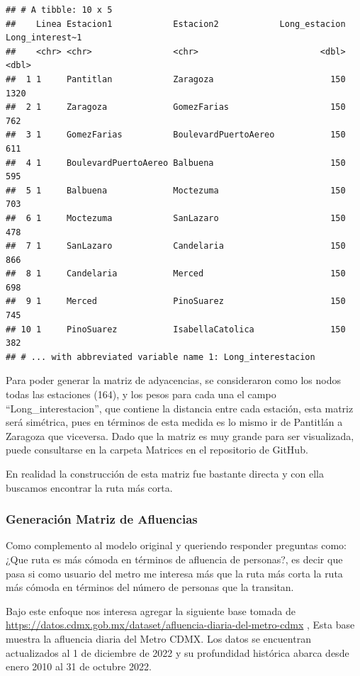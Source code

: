 \documentclass[
]{article}
\begin{document}
\begin{verbatim}
## # A tibble: 10 x 5
##    Linea Estacion1            Estacion2            Long_estacion Long_interest~1
##    <chr> <chr>                <chr>                        <dbl>           <dbl>
##  1 1     Pantitlan            Zaragoza                       150            1320
##  2 1     Zaragoza             GomezFarias                    150             762
##  3 1     GomezFarias          BoulevardPuertoAereo           150             611
##  4 1     BoulevardPuertoAereo Balbuena                       150             595
##  5 1     Balbuena             Moctezuma                      150             703
##  6 1     Moctezuma            SanLazaro                      150             478
##  7 1     SanLazaro            Candelaria                     150             866
##  8 1     Candelaria           Merced                         150             698
##  9 1     Merced               PinoSuarez                     150             745
## 10 1     PinoSuarez           IsabellaCatolica               150             382
## # ... with abbreviated variable name 1: Long_interestacion
\end{verbatim}

Para poder generar la matriz de adyacencias, se consideraron como los
nodos todas las estaciones (164), y los pesos para cada una el campo
``Long\_interestacion'', que contiene la distancia entre cada estación,
esta matriz será simétrica, pues en términos de esta medida es lo mismo
ir de Pantitlán a Zaragoza que viceversa. Dado que la matriz es muy
grande para ser visualizada, puede consultarse en la carpeta Matrices en
el repositorio de GitHub.

En realidad la construcción de esta matriz fue bastante directa y con
ella buscamos encontrar la ruta más corta.

\hypertarget{generaciuxf3n-matriz-de-afluencias}{%
\subsubsection{Generación Matriz de
Afluencias}\label{generaciuxf3n-matriz-de-afluencias}}

Como complemento al modelo original y queriendo responder preguntas
como: ¿Que ruta es más cómoda en términos de afluencia de personas?, es
decir que pasa si como usuario del metro me interesa más que la ruta más
corta la ruta más cómoda en términos del número de personas que la
transitan.

Bajo este enfoque nos interesa agregar la siguiente base tomada de
\url{https://datos.cdmx.gob.mx/dataset/afluencia-diaria-del-metro-cdmx}
, Esta base muestra la afluencia diaria del Metro CDMX. Los datos se
encuentran actualizados al 1 de diciembre de 2022 y su profundidad
histórica abarca desde enero 2010 al 31 de octubre 2022.
\end{document}
